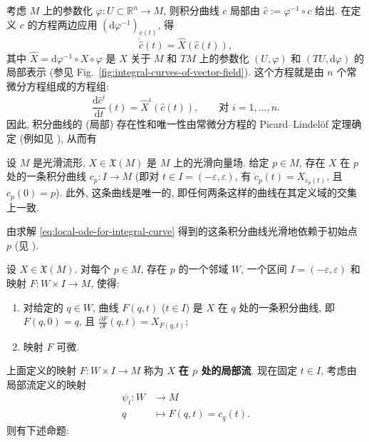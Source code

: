 考虑 $M$ 上的参数化 $\varphi:U\subset\mathbb{R}^n\to M$, 则积分曲线 $c$ 局部由 $\widehat c:=\varphi^{-1}\circ c$ 给出. 在定义 $c$ 的方程两边应用 $(\mathrm{d}\varphi^{-1})_{c(t)}$, 得
\[
  \dot{\widehat c}(t)=\widehat X(\widehat c(t)),
\]
其中 $\widehat X=\mathrm{d}\varphi^{-1}\circ X\circ\varphi$ 是 $X$ 关于 $M$ 和 $TM$ 上的参数化 $(U,\varphi)$ 和 $(TU,\mathrm{d}\varphi)$ 的局部表示 (参见 Fig.~\ref{fig:integral-curves-of-vector-field}). 这个方程就是由 $n$ 个常微分方程组成的方程组:
\begin{equation}\label{eq:local-ode-for-integral-curve}
  \frac{\mathrm{d}\widehat c^i}{\mathrm{d}t}(t)
  =\widehat X^i(\widehat c(t)),\qquad
  \text{对 } i=1,\ldots,n.
\end{equation}
因此, 积分曲线的 (局部) 存在性和唯一性由常微分方程的 Picard–Lindelöf 定理确定 (例如见 ), 从而有

\begin{RiemannTheorem}\label{thm:local-existence-of-integral-curves}
设 $M$ 是光滑流形, $X\in\mathfrak{X}(M)$ 是 $M$ 上的光滑向量场. 给定 $p\in M$, 存在 $X$ 在 $p$ 处的一条积分曲线 $c_p:I\to M$ (即对 $t\in I=(-\varepsilon,\varepsilon)$, 有 $\dot c_p(t)=X_{c_p(t)}$, 且 $c_p(0)=p$). 此外, 这条曲线是唯一的, 即任何两条这样的曲线在其定义域的交集上一致.\hfill\openbox
\end{RiemannTheorem}


由求解 \eqref{eq:local-ode-for-integral-curve} 得到的这条积分曲线光滑地依赖于初始点 $p$ (见 ).

\begin{RiemannTheorem}\label{thm:smooth-dependence-of-local-flow}
设 $X\in\mathfrak{X}(M)$. 对每个 $p\in M$, 存在 $p$ 的一个邻域 $W$, 一个区间 $I=(-\varepsilon,\varepsilon)$ 和映射 $F:W\times I\to M$, 使得:
\begin{enumerate}[label=(\roman*),leftmargin=*]
\item 对给定的 $q\in W$, 曲线 $F(q,t)$ ($t\in I$) 是 $X$ 在 $q$ 处的一条积分曲线, 即 $F(q,0)=q$, 且 $\frac{\partial F}{\partial t}(q,t)=X_{F(q,t)}$;
\item 映射 $F$ 可微.\hfill\openbox
\end{enumerate}
\end{RiemannTheorem}

上面定义的映射 $F:W\times I\to M$ 称为 $X$ \textbf{在 $p$ 处的局部流}. 现在固定 $t\in I$, 考虑由局部流定义的映射
\begin{align*}
  \psi_t:W&\to M\\
  q&\mapsto F(q,t)=c_q(t).
\end{align*}
则有下述命题:

